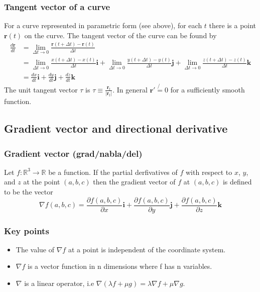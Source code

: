 \documentclass[12pt]{article}
\begin{document}
		\subsubsection{Tangent vector of a curve}
		For a curve represented in parametric form (see above), for each $t$ there is a point $\mathbf{r}(t)$ on the curve. The tangent
		vector of the curve can be found by
		\begin{align*}
			\frac{d\mathbf{r}}{dt}& = \lim_{\Delta t \to 0} \frac{\mathbf{r}(t+\Delta t) - \mathbf{r}(t)}{\Delta t} \\
							& = \lim_{\Delta t \to 0} \frac{x(t+\Delta t) - x(t)}{\Delta t} \mathbf{i} + 
								  \lim_{\Delta t \to 0} \frac{y(t+\Delta t) - y(t)}{\Delta t} \mathbf{j} + 
								  \lim_{\Delta t \to 0} \frac{z(t+\Delta t) - z(t)}{\Delta t} \mathbf{k} \\
							& = \frac{dx}{dt} \mathbf{i} + \frac{dy}{dt} \mathbf{j} + \frac{dz}{dt} \mathbf{k}
		\end{align*} 
		The unit tangent vector $\tau$ is $\tau \equiv \frac{\mathbf{r}_t}{|\mathbf{r}_t|}$. In general $\mathbf{r}' \not{=} 0$ for
		a sufficiently smooth function.
		
	\subsection{Gradient vector and directional derivative}
		
		\subsubsection{Gradient vector (grad/nabla/del)}
		\begin{defn}
			Let $f:\mathbb{R}^3 \to \mathbb{R}$ be a function. If the partial derfivatives of $f$ with respect to $x$, $y$, and $z$
			at the point $(a,b,c)$ then the gradient vector of $f$ at $(a,b,c)$ is defined to be the vector
			\[
				\nabla f(a,b,c) = \frac{\partial f(a,b,c)}{\partial x}\mathbf{i} + 
									\frac{\partial f(a,b,c)}{\partial y}\mathbf{j} + 
									\frac{\partial f(a,b,c)}{\partial z}\mathbf{k}
			\]
		\end{defn}
		
		\subsubsection{Key points}
		\begin{itemize}
			\item The value of $\nabla f$ at a point is independent of the coordinate system.
			\item $\nabla f$ is a vector function in n dimensions where f has n variables.
			\item $\nabla$ is a linear operator, i.e $\nabla (\lambda f + \mu g) = \lambda \nabla f + \mu \nabla g$.
		\end{itemize}
		
\end{document}
